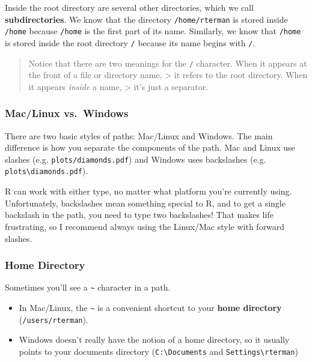 \documentclass[]{book}
\providecommand{\tightlist}{%
  \setlength{\itemsep}{0pt}\setlength{\parskip}{0pt}}
\begin{document}
Inside the root directory are several other directories, which we call \textbf{subdirectories}. We know that the directory \texttt{/home/rterman} is stored inside \texttt{/home} because \texttt{/home} is the first part of its name. Similarly, we know that \texttt{/home} is stored inside the root directory \texttt{/} because its name begins with \texttt{/}.

\begin{quote}
Notice that there are two meanings for the \texttt{/} character.
When it appears at the front of a file or directory name,
\textgreater{} it refers to the root directory. When it appears \emph{inside} a name,
\textgreater{} it's just a separator.
\end{quote}

\hypertarget{maclinux-vs.windows}{%
\subsubsection*{Mac/Linux vs.~Windows}\label{maclinux-vs.windows}}

There are two basic styles of paths: Mac/Linux and Windows. The main difference is how you separate the components of the path. Mac and Linux use slashes (e.g. \texttt{plots/diamonds.pdf}) and Windows uses backslashes (e.g. \texttt{plots\textbackslash{}diamonds.pdf}).

R can work with either type, no matter what platform you're currently using. Unfortunately, backslashes mean something special to R, and to get a single backslash in the path, you need to type two backslashes! That makes life frustrating, so I recommend always using the Linux/Mac style with forward slashes.

\hypertarget{home-directory}{%
\subsubsection*{Home Directory}\label{home-directory}}

Sometimes you'll see a \texttt{\textasciitilde{}} character in a path.

\begin{itemize}
\tightlist
\item
  In Mac/Linux, the \texttt{\textasciitilde{}} is a convenient shortcut to your \textbf{home directory} (\texttt{/users/rterman}).
\item
  Windows doesn't really have the notion of a home directory, so it usually points to your documents directory (\texttt{C:\textbackslash{}Documents} and \texttt{Settings\textbackslash{}rterman})
\end{itemize}
\end{document}
